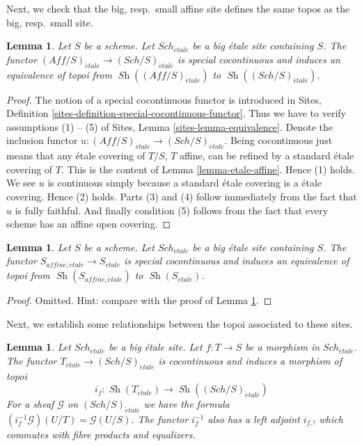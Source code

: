 \documentclass{stacks-project}
\theoremstyle{plain}
\newtheorem{lemma}[subsection]{Lemma}
\theoremstyle{definition}
\theoremstyle{remark}
\numberwithin{equation}{subsection}
\def\Sch{\mathit{Sch}}
\def\Sh{\mathop{\mathit{Sh}}\nolimits}
\def\etale{{\acute{e}tale}}
\begin{document}
\noindent
Next, we check that the big, resp.\ small affine site defines the same
topos as the big, resp.\ small site.

\begin{lemma}
\label{lemma-affine-big-site-etale}
Let $S$ be a scheme. Let $\Sch_\etale$ be a big \'etale
site containing $S$.
The functor
$(\textit{Aff}/S)_\etale \to (\Sch/S)_\etale$
is special cocontinuous and induces an equivalence of topoi from
$\Sh((\textit{Aff}/S)_\etale)$ to
$\Sh((\Sch/S)_\etale)$.
\end{lemma}

\begin{proof}
The notion of a special cocontinuous functor is introduced in
Sites, Definition \ref{sites-definition-special-cocontinuous-functor}.
Thus we have to verify assumptions (1) -- (5) of
Sites, Lemma \ref{sites-lemma-equivalence}.
Denote the inclusion functor
$u : (\textit{Aff}/S)_\etale \to (\Sch/S)_\etale$.
Being cocontinuous just means that any \'etale covering of
$T/S$, $T$ affine, can be refined by a standard \'etale covering of $T$.
This is the content of
Lemma \ref{lemma-etale-affine}.
Hence (1) holds. We see $u$ is continuous simply because a standard
\'etale covering is a \'etale covering. Hence (2) holds.
Parts (3) and (4) follow immediately from the fact that $u$ is
fully faithful. And finally condition (5) follows from the
fact that every scheme has an affine open covering.
\end{proof}

\begin{lemma}
\label{lemma-alternative}
Let $S$ be a scheme. Let $\Sch_\etale$ be a big \'etale
site containing $S$. The functor $S_{affine, \etale} \to S_\etale$
is special cocontinuous and induces an equivalence of topoi from
$\Sh(S_{affine, \etale})$ to $\Sh(S_\etale)$.
\end{lemma}

\begin{proof}
Omitted. Hint: compare with the proof of
Lemma \ref{lemma-affine-big-site-etale}.
\end{proof}

\noindent
Next, we establish some relationships between the topoi
associated to these sites.

\begin{lemma}
\label{lemma-put-in-T-etale}
Let $\Sch_\etale$ be a big \'etale site.
Let $f : T \to S$ be a morphism in $\Sch_\etale$.
The functor $T_\etale \to (\Sch/S)_\etale$
is cocontinuous and induces a morphism of topoi
$$
i_f :
\Sh(T_\etale)
\longrightarrow
\Sh((\Sch/S)_\etale)
$$
For a sheaf $\mathcal{G}$ on $(\Sch/S)_\etale$
we have the formula $(i_f^{-1}\mathcal{G})(U/T) = \mathcal{G}(U/S)$.
The functor $i_f^{-1}$ also has a left adjoint $i_{f, !}$ which commutes
with fibre products and equalizers.
\end{lemma}
\end{document}
